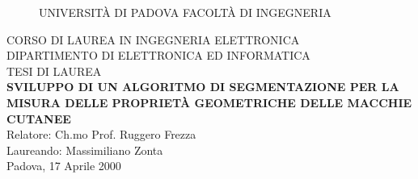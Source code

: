 \thispagestyle{empty}

\small

\begin{figure}
\epsfxsize=2cm
\centerline{
UNIVERSIT\`A DI PADOVA
\epsfysize 1.8cm 
FACOLT\`A DI INGEGNERIA
}
\end{figure}
\vspace{.8cm}
\center
{\tiny CORSO DI LAUREA IN INGEGNERIA ELETTRONICA\\
DIPARTIMENTO DI ELETTRONICA ED INFORMATICA\\}
\vspace{1.5cm}
\small
TESI DI LAUREA\\
\vspace{1.5cm}
{\normalsize\bf
SVILUPPO DI UN ALGORITMO DI SEGMENTAZIONE PER LA MISURA DELLE PROPRIET\`A GEOMETRICHE DELLE
MACCHIE CUTANEE\\}
\vspace{2cm}
\small
Relatore: Ch.mo Prof. Ruggero Frezza \\
\vspace{.5cm}
Laureando: Massimiliano Zonta\\
\vfill
Padova, 17 Aprile 2000 
\nocite{*}


